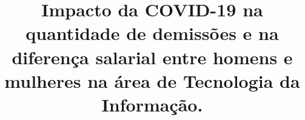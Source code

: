 \title{Impacto da COVID-19 na quantidade de demissões e na diferença salarial entre homens e mulheres na área de Tecnologia da Informação.  \\
}